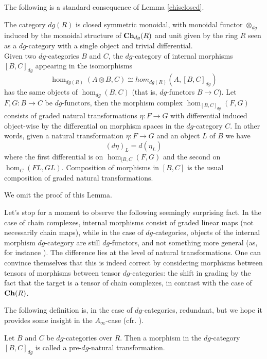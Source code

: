 The following is a standard consequence of Lemma \ref{chisclosed}.
\begin{lem}
    The category $dg(R)$ is closed symmetric monoidal, with monoidal functor $\otimes_{dg}$ induced by the monoidal structure of $\mathbf{Ch}_{dg}(R)$ and unit given by the ring $R$ seen as a $dg$-category with a single object and trivial differential.\\
    Given two $dg$-categories $B$ and $C$, the $dg$-category of internal morphisms $[B,C]_{dg}$ appearing in the isomorphisms $$\hom_{dg(R)}(A\otimes B,C)\cong hom_{dg(R)}(A, [B,C]_{dg})$$ has the same objects of $\hom_{dg}(B,C)$ (that is, $dg$-functors $B\to C$). Let $F,G\colon B\to C$ be $dg$-functors, then the morphism complex $\hom_{[B,C]_{dg}}(F,G)$ consists of graded natural transformations $\eta\colon F\to G$ with differential induced object-wise by the differential on morphism spaces in the $dg$-category $C$. In other words, given a natural transformation $\eta\colon F\to G$ and an object $L$ of $B$ we have $$(d\eta)_L = d(\eta_L)$$ where the first differential is on $\hom_{[B,C}(F,G)$ and the second on $\hom_C(FL,GL)$. Composition of morphisms in $[B,C]$ is the usual composition of graded natural transformations.
\end{lem}

\noindent We omit the proof of this Lemma. %
\begin{remark}
    Let's stop for a moment to observe the following seemingly surprising fact. In the case of chain complexes, internal morphisms consist of graded linear maps (not necessarily chain maps), while in the case of $dg$-categories, objects of the internal morphism $dg$-category are still $dg$-functors, and not something more general (as, for instance ). The difference lies at the level of natural transformations. One can convince themselves that this is indeed correct by considering morphisms between tensors of morphisms between tensor $dg$-categories: the shift in grading  by the fact that the target is a tensor of chain complexes, in contrast with the case of $\mathbf{Ch}(R)$.
\end{remark}

The following definition is, in the case of $dg$-categories, redundant, but we hope it provides some insight in the $A_\infty$-case (cfr. \cite[Section (1d)]{Se:book-fukaya-categ}).
\begin{dfn}
    Let $B$ and $C$ be $dg$-categories over $R$. Then a morphism in the $dg$-category $[B,C]_{dg}$ is called a pre-$dg$-natural transformation.
\end{dfn}

